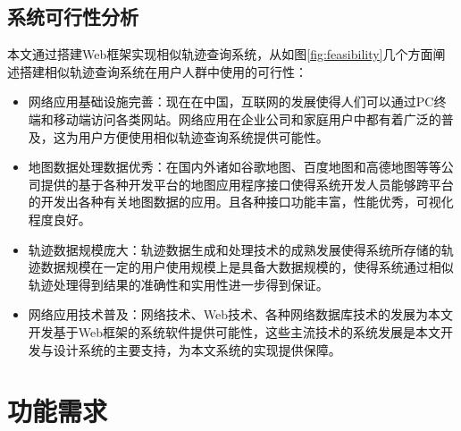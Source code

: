 \subsection{系统可行性分析}
\label{subsec:system feasibility}
本文通过搭建Web框架实现相似轨迹查询系统，从如图\ref{fig:feasibility}几个方面阐述搭建相似轨迹查询系统在用户人群中使用的可行性：
\begin{itemize}
	\item 网络应用基础设施完善：现在在中国，互联网的发展使得人们可以通过PC终端和移动端访问各类网站。网络应用在企业公司和家庭用户中都有着广泛的普及，这为用户方便使用相似轨迹查询系统提供可能性。
	\item 地图数据处理数据优秀：在国内外诸如谷歌地图、百度地图和高德地图等等公司提供的基于各种开发平台的地图应用程序接口使得系统开发人员能够跨平台的开发出各种有关地图数据的应用。且各种接口功能丰富，性能优秀，可视化程度良好。
	\item 轨迹数据规模庞大：轨迹数据生成和处理技术的成熟发展使得系统所存储的轨迹数据规模在一定的用户使用规模上是具备大数据规模的，使得系统通过相似轨迹处理得到结果的准确性和实用性进一步得到保证。
	\item 网络应用技术普及：网络技术、Web技术、各种网络数据库技术的发展为本文开发基于Web框架的系统软件提供可能性，这些主流技术的系统发展是本文开发与设计系统的主要支持，为本文系统的实现提供保障。
\end{itemize}

\vspace{3mm}

\begin{figure}[!htp]
    \centering
    \resizebox{!}{!}{}
\end{figure}




\section{功能需求}
\label{sec:function requirements}

